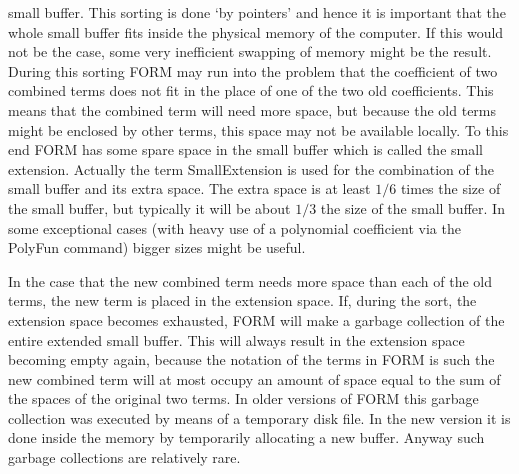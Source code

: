 small buffer. This sorting is done 
`by pointers' and hence it is important that the whole small buffer fits 
inside the physical memory of the computer. If this would not be the case, 
some very inefficient swapping of memory might be the result. During this 
sorting FORM may run into the problem that the coefficient of two combined 
terms does not fit in the place of one of the two old coefficients. This 
means that the combined term will need more space, but because the old 
terms might be enclosed by other terms, this space may not be available 
locally. To this end FORM has some spare space in the small buffer which is 
called the small extension. 
Actually the term SmallExtension is used for the 
combination of the small buffer and its extra space. The extra space is at 
least $1/6$ times the size of the small buffer, but typically it will be 
about $1/3$ the size of the small buffer. In some exceptional cases (with 
heavy use of a polynomial coefficient via the PolyFun 
command) bigger sizes might be useful.

In the case that the new combined term needs more space than each of the 
old terms, the new term is placed in the extension space. If, during the 
sort, the extension space becomes exhausted, FORM will make a 
garbage 
collection of the entire extended small buffer. This will always result in 
the extension space becoming empty again, because the notation of the terms 
in FORM is such the new combined term will at most occupy an amount 
of space equal to the sum of the spaces of the original two terms. In older 
versions of FORM this garbage collection was executed by means of a 
temporary disk file. In the new version it is done inside the memory by 
temporarily allocating a new buffer. Anyway such garbage collections are 
relatively rare.

